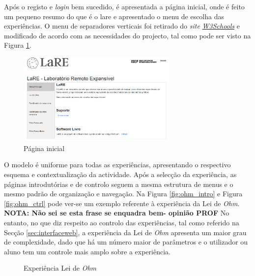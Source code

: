 Após o registo e \textit{login} bem sucedido, é apresentada a página inicial, onde é feito um pequeno resumo do que é o \acrshort{lare} e apresentado o menu de escolha das experiências. O menu de separadores verticais foi retirado do \textit{site} \href{https://www.w3schools.com/howto/howto_js_vertical_tabs.asp}{\textit{W3Schools}} e modificado de acordo com as necessidades do projecto, tal como pode ser visto na Figura \ref{fig:pagmenu}.

\begin{figure}[hbtp]
	\centering
	\includegraphics[width=0.7\textwidth]{figures/menupage.png}
	\caption{Página inicial}
	\label{fig:pagmenu}
\end{figure}

O modelo é uniforme para todas as experiências, apresentando o respectivo esquema e contextualização da actividade. Após a selecção da experiência, as páginas introdutórias e de controlo seguem a mesma estrutura de menus e o mesmo padrão de organização e navegação. Na Figura \ref{fig:ohm_intro} e Figura \ref{fig:ohm_ctrl} pode ver-se um exemplo referente à experiência da Lei de \textit{Ohm}. 
\textbf{NOTA: Não sei se esta frase se enquadra bem- opinião PROF} No entanto, no que diz respeito ao controlo das experiências, tal como referido na Secção \ref{sec:interfaceweb}, a experiência da Lei de \textit{Ohm} apresenta um maior grau de complexidade, dado que há um número maior de parâmetros e o utilizador ou aluno tem um controle mais amplo sobre a experiência.

\begin{figure}[hbtp]
	\centering%
		\centering
		\qquad
		\caption{ Experiência Lei de \textit{Ohm}}%
		\label{fig:pagohm}%
	\end{figure}

